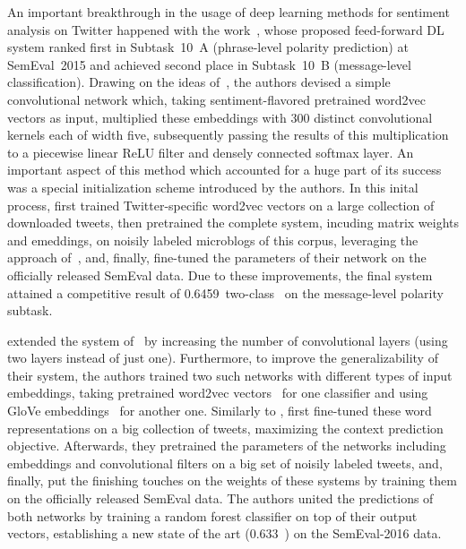 An important breakthrough in the usage of deep learning methods for
sentiment analysis on Twitter happened with the
work~\citet{Severyn:15}, whose proposed feed-forward DL system ranked
first in Subtask~10~A (phrase-level polarity prediction) at
SemEval~2015 \cite{Rosenthal:15} and achieved second place in
Subtask~10~B (message-level classification).  Drawing on the ideas
of~\citet{Kalchbrenner:14}, the authors devised a simple convolutional
network which, taking sentiment-flavored pretrained word2vec vectors
as input, multiplied these embeddings with 300 distinct convolutional
kernels each of width five, subsequently passing the results of this
multiplication to a piecewise linear ReLU filter and densely connected
softmax layer.  An important aspect of this method which accounted for
a huge part of its success was a special initialization scheme
introduced by the authors.  In this inital process,
\citeauthor{Severyn:15} first trained Twitter-specific word2vec
vectors on a large collection of downloaded tweets, then pretrained
the complete system, incuding matrix weights and emeddings, on noisily
labeled microblogs of this corpus, leveraging the approach
of~\citeauthor{Go:09}, and, finally, fine-tuned the parameters of
their network on the officially released SemEval data.  Due to these
improvements, the final system attained a competitive result of
0.6459~two-class~\F{} on the message-level polarity subtask.



\citet{Deriu:16} extended the system of~\citet{Severyn:15} by
increasing the number of convolutional layers (using two layers
instead of just one).  Furthermore, to improve the generalizability of
their system, the authors trained two such networks with different
types of input embeddings, taking pretrained word2vec
vectors~\cite{Mikolov:13} for one classifier and using GloVe
embeddings~\cite{Pennington:14} for another one.  Similarly to
\citet{Severyn:15}, \citeauthor{Deriu:16} first fine-tuned these word
representations on a big collection of tweets, maximizing the context
prediction objective.  Afterwards, they pretrained the parameters of
the networks including embeddings and convolutional filters on a big
set of noisily labeled tweets, and, finally, put the finishing touches
on the weights of these systems by training them on the officially
released SemEval data.  The authors united the predictions of both
networks by training a random forest classifier on top of their output
vectors, establishing a new state of the art (0.633~\F{}) on the
SemEval-2016 data.

